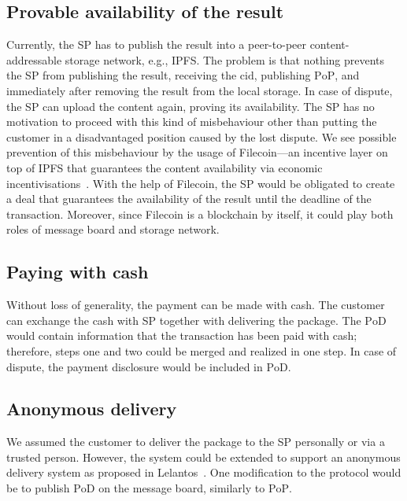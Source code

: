 \documentclass{ieeeaccess}
\begin{document}
\subsection{Provable availability of the
result}\label{cryptographically-provable-availability-of-results}

Currently, the SP has to publish the result into a peer-to-peer content-addressable storage network, e.g., IPFS. The problem is that nothing prevents the SP from publishing the result, receiving the $\mathrm{cid}$, publishing $\mathrm{PoP}$, and immediately after removing the result from the local storage. In case of dispute, the SP can upload the content again, proving its availability. The SP has no motivation to proceed with this kind of misbehaviour other than putting the customer in a disadvantaged position caused by the lost dispute. We see possible prevention of this misbehaviour by the usage of Filecoin—an incentive layer on top of IPFS that guarantees the content availability via economic incentivisations~\cite{protocollabsFilecoinDecentralizedStorage2017}. With the help of Filecoin, the SP would be obligated to create a deal that guarantees the availability of the result until the deadline of the transaction. Moreover, since Filecoin is a blockchain by itself, it could play both roles of message board and storage network.

\subsection{Paying with cash}\label{paying-with-cash}

Without loss of generality, the payment can be made with cash. The customer can exchange the cash with SP together with delivering the package. The $\mathrm{PoD}$ would contain information that the transaction has been paid with cash; therefore, steps one and two could be merged and realized in one step. In case of dispute, the payment disclosure would be included in $\mathrm{PoD}$.

\subsection{Anonymous delivery}\label{anonymous-delivery}

We assumed the customer to deliver the package to the SP personally or via a trusted person. However, the system could be extended to support an anonymous delivery system as proposed in Lelantos~\cite{altawyLelantosBlockchainBasedAnonymous2017}. One modification to the protocol would be to publish $\mathrm{PoD}$ on the message board, similarly to $\mathrm{PoP}$.
\end{document}
